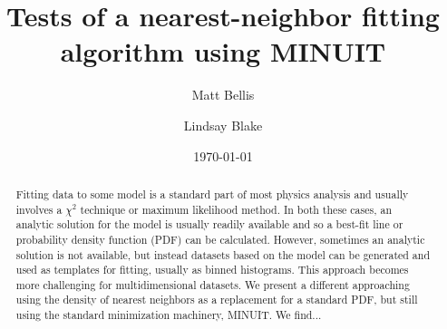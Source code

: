 \documentclass[prb,preprint]{revtex4-1}
\begin{document}

\title{Tests of a nearest-neighbor fitting algorithm using MINUIT}

\author{Matt Bellis}
\author{Lindsay Blake}



\date{\today}

\begin{abstract}
Fitting data to some model is a standard part of most physics analysis 
and usually involves a $\chi^2$ technique or maximum likelihood method. 
In both these cases, an analytic solution for the model is usually 
readily available and so a best-fit line or probability density function (PDF)
can be calculated. However, sometimes an analytic solution is not available,
but instead datasets based on the model can be generated and used
as templates for fitting, usually as binned histograms. This approach
becomes more challenging for multidimensional datasets. We present a
different approaching using the density of nearest neighbors as a 
replacement for a standard PDF, but still using the standard minimization
machinery, MINUIT. We find...
\end{abstract}

\maketitle %


\end{document}
